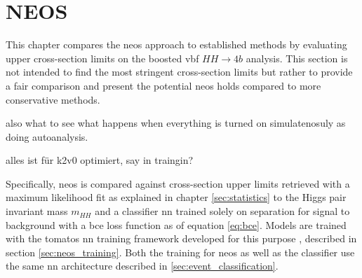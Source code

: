 \chapter{NEOS}
This chapter compares the \ac{neos} approach to established methods by evaluating upper cross-section limits on the boosted \ac{vbf} $HH\rightarrow4b$ analysis. This section is not intended to find the most stringent cross-section limits but rather to provide a fair comparison and present the potential \ac{neos} holds compared to more conservative methods.

also what to see what happens when everything is turned on simulatenosuly as doing autoanalysis.

alles ist für k2v0 optimiert, say in traingin?

Specifically, \ac{neos} is compared against cross-section upper limits retrieved with a maximum likelihood fit as explained in chapter \ref{sec:statistics} to the Higgs pair invariant mass $m_{HH}$ and a classifier \ac{nn} trained solely on separation for signal to background with a \ac{bce} loss function as of equation \ref{eq:bce}. Models are trained with the \ac{tomatos} \ac{nn} training framework developed for this purpose \citep{tomatos}, described in section \ref{sec:neos_training}. Both the training for \ac{neos} as well as the classifier use the same \ac{nn} architecture described in \ref{sec:event_classification}.

